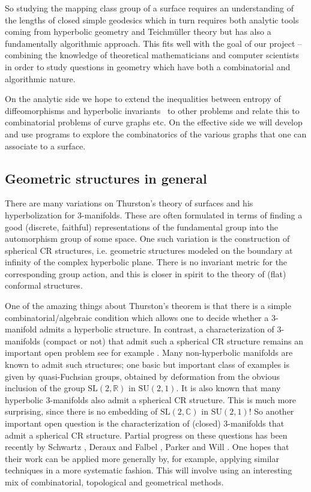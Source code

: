 \documentclass[14pt,fleqn]{article}
\begin{document}
So studying the mapping class group of a surface 
requires 
an understanding 
of the lengths of closed simple geodesics
which in turn 
requires both analytic tools
coming from hyperbolic geometry and Teichmüller theory 
but has also a fundamentally
algorithmic approach.
This fits well with the  goal of our project -- combining the knowledge of theoretical
mathematicians and computer scientists in order to study questions in
geometry
which have both a combinatorial and algorithmic nature.  



On the analytic side we hope to extend the
inequalities between entropy of diffeomorphisms and hyperbolic
invariants~\cite{km-nevvp-18} to other problems and relate this to combinatorial problems
of curve graphs etc. On the effective side we will develop and use
programs to explore the combinatorics of the various graphs that one
can associate to a surface.

\subsection{Geometric structures in general}

There are many variations
 on Thurston's theory of surfaces and his
 hyperbolization for 3-manifolds.
 These are often formulated in terms 
 of finding a good (discrete, faithful) 
 representations of the fundamental group
 into the automorphism group of some space.
 One such variation  is the construction of
spherical CR structures, 
i.e. geometric structures modeled on the
boundary at infinity of the complex hyperbolic plane. There is no
invariant metric for the corresponding group action, and this is
closer in spirit to the theory of (flat) conformal structures.

One of the amazing things about Thurston's theorem
is that there is a simple combinatorial/algebraic
condition which allows one to decide whether 
a 3-manifold admits a hyperbolic structure.
In contrast, a characterization of
3-manifolds (compact or not) that admit such a spherical CR structure remains an important open problem see for example \cite{derauxexpmath}.
Many non-hyperbolic manifolds are known to admit such
structures; 
one basic but important class of examples is given by
quasi-Fuchsian groups, obtained by deformation from the obvious inclusion of the group
$\mathrm{SL}(2,\mathbb{R})$ in $\mathrm{SU}(2,1)$.
It is also known that many hyperbolic 3-manifolds also admit a spherical CR structure.
This is much more surprising, since there is no
embedding of $\mathrm{SL}(2,\mathbb{C})$
 in $\mathrm{SU}(2,1)$! 
So another important open question is the characterization of (closed) 3-manifolds that admit a spherical CR structure.
Partial progress on these questions
 has been recently by Schwartz \cite{schwartz}, Deraux and Falbel \cite{derauxfalbel}, Parker and  Will \cite{parkerwill}.
One hopes that their work can be applied more generally by, for example, applying similar techniques in a more systematic fashion. 
This will involve using an interesting mix of
combinatorial, topological and geometrical methods.
\end{document}
